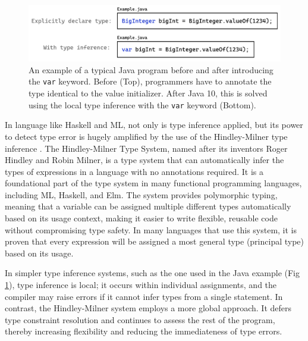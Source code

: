 \begin{figure}[hbt]
  \includegraphics[width=\linewidth]{ExampleJava}
  \caption{
    \label{fig:example-java}
      An example of a typical Java program before and after introducing the \texttt{var} keyword. Before (Top), programmers have to annotate the type identical to the value initializer. After Java 10, this is solved using the local type inference with the \texttt{var} keyword (Bottom).
    }
\end{figure}

In language like Haskell and ML, not only is type inference applied, but its power to detect type error is hugely amplified by the use of the Hindley-Milner type inference  \cite{Damas1982-zw}. The Hindley-Milner Type System, named after its inventors Roger Hindley and Robin Milner, is a type system that can automatically infer the types of expressions in a language with no annotations required. It is a foundational part of the type system in many functional programming languages, including ML, Haskell, and Elm. The system provides polymorphic typing, meaning that a variable can be assigned multiple different types automatically based on its usage context, making it easier to write flexible, reusable code without compromising type safety. In many languages that use this system, it is proven that every expression will be assigned a most general type (principal type) based on its usage. 


In simpler type inference systems, such as the one used in the Java example (Fig \ref{fig:example-java}), type inference is local; it occurs within individual assignments, and the compiler may raise errors if it cannot infer types from a single statement. In contrast, the Hindley-Milner system employs a more global approach. It defers type constraint resolution and continues to assess the rest of the program, thereby increasing flexibility and reducing the immediateness of type errors.




